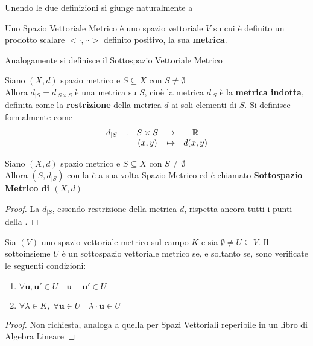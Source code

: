 Unendo le due definizioni si giunge naturalmente a
\begin{definition}
	\label{def:sp_vett_normato}
	Uno Spazio Vettoriale Metrico è uno spazio vettoriale $V$ su cui è definito un prodotto scalare $<\cdot,\cdot·>$ definito positivo, la sua \textbf{metrica}.
	\begin{note}
		Analogamente si definisce il Sottospazio Vettoriale Metrico
	\end{note}
\end{definition}

\begin{definition}
	\label{def:metr_indotta}
	Siano $(X,d)$ spazio metrico e $S \subseteq X$ con $S \neq \emptyset$\\
	Allora $d_{|S} = d_{|S \times S}$ è una metrica su $S$, cioè la metrica $d_{|S}$ è la \textbf{metrica indotta}, definita come la \textbf{restrizione} della metrica $d$ ai soli elementi di $S$. Si definisce formalmente come
	\[\begin{array}{ccccc} {d_{|S}} & : & {S \times S} & \to & {\mathbb{R}} \\ & & {(x,y)} & \mapsto & {d(x,y)} \\ \end{array}\]
\end{definition}

\begin{definition}
	Siano $(X,d)$ spazio metrico e $S \subseteq X$ con $S \neq \emptyset$\\
	Allora $(S,d_{|S})$ con la  è a sua volta Spazio Metrico ed è chiamato \textbf{Sottospazio Metrico di $(X,d)$}
	\begin{proof}
		La $d_{|S}$, essendo restrizione della metrica $d$, rispetta ancora tutti i punti della .
	\end{proof}
\end{definition}

\begin{proposition}
	\label{prop:subspace_condition}
	Sia $(V)$ uno spazio vettoriale metrico sul campo $K$ e sia $\emptyset \neq U \subseteq V$. Il sottoinsieme $U$ è un sottospazio vettoriale metrico se, e soltanto se, sono verificate le seguenti condizioni:
	\begin{enumerate}
		\item $\forall \mathbf{u}, \mathbf{u'} \in U \quad \mathbf{u} + \mathbf{u'} \in U$
		\item $\forall \lambda \in K,\; \forall \mathbf{u} \in U \quad \lambda \cdot \mathbf{u} \in U$
	\end{enumerate}
	\begin{proof}
		Non richiesta, analoga a quella per Spazi Vettoriali reperibile in un libro di Algebra Lineare
	\end{proof}
\end{proposition}

